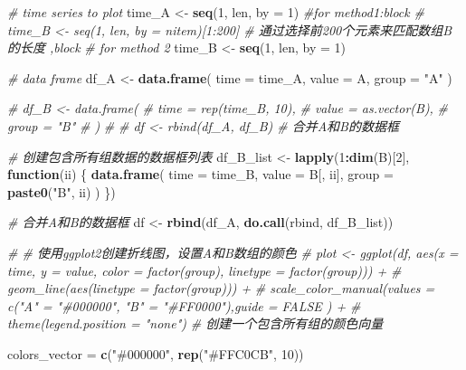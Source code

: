 \documentclass[
]{article}
\newenvironment{Shaded}{\begin{snugshade}}{\end{snugshade}}
\newcommand{\AttributeTok}[1]{\textcolor[rgb]{0.13,0.29,0.53}{#1}}
\newcommand{\CommentTok}[1]{\textcolor[rgb]{0.56,0.35,0.01}{\textit{#1}}}
\newcommand{\ControlFlowTok}[1]{\textcolor[rgb]{0.13,0.29,0.53}{\textbf{#1}}}
\newcommand{\DecValTok}[1]{\textcolor[rgb]{0.00,0.00,0.81}{#1}}
\newcommand{\FunctionTok}[1]{\textcolor[rgb]{0.13,0.29,0.53}{\textbf{#1}}}
\newcommand{\NormalTok}[1]{#1}
\newcommand{\OtherTok}[1]{\textcolor[rgb]{0.56,0.35,0.01}{#1}}
\newcommand{\SpecialCharTok}[1]{\textcolor[rgb]{0.81,0.36,0.00}{\textbf{#1}}}
\newcommand{\StringTok}[1]{\textcolor[rgb]{0.31,0.60,0.02}{#1}}
\begin{document}
\begin{Shaded}
\begin{Highlighting}[]
\CommentTok{\# time series to plot}
\NormalTok{time\_A }\OtherTok{\textless{}{-}} \FunctionTok{seq}\NormalTok{(}\DecValTok{1}\NormalTok{, len, }\AttributeTok{by =} \DecValTok{1}\NormalTok{)  }
\CommentTok{\#for method1:block}
\CommentTok{\# time\_B \textless{}{-} seq(1, len, by = nitem)[1:200]  \# 通过选择前200个元素来匹配数组B的长度 ,block}
\CommentTok{\# for method 2}
\NormalTok{time\_B }\OtherTok{\textless{}{-}} \FunctionTok{seq}\NormalTok{(}\DecValTok{1}\NormalTok{, len, }\AttributeTok{by =} \DecValTok{1}\NormalTok{)}

\CommentTok{\# data frame}
\NormalTok{df\_A }\OtherTok{\textless{}{-}} \FunctionTok{data.frame}\NormalTok{(  }
  \AttributeTok{time =}\NormalTok{ time\_A,  }
  \AttributeTok{value =}\NormalTok{ A,  }
  \AttributeTok{group =} \StringTok{"A"}  
\NormalTok{)  }
  
\CommentTok{\# df\_B \textless{}{-} data.frame(  }
\CommentTok{\#   time = rep(time\_B, 10),  }
\CommentTok{\#   value = as.vector(B),  }
\CommentTok{\#   group = "B"  }
\CommentTok{\# )  }
\CommentTok{\#   }
\CommentTok{\# df \textless{}{-} rbind(df\_A, df\_B)  \# 合并A和B的数据框  }

  \CommentTok{\# 创建包含所有组数据的数据框列表  }
\NormalTok{df\_B\_list }\OtherTok{\textless{}{-}} \FunctionTok{lapply}\NormalTok{(}\DecValTok{1}\SpecialCharTok{:}\FunctionTok{dim}\NormalTok{(B)[}\DecValTok{2}\NormalTok{], }\ControlFlowTok{function}\NormalTok{(ii) \{  }
  \FunctionTok{data.frame}\NormalTok{(  }
    \AttributeTok{time =}\NormalTok{ time\_B,  }
    \AttributeTok{value =}\NormalTok{ B[, ii],  }
    \AttributeTok{group =} \FunctionTok{paste0}\NormalTok{(}\StringTok{"B"}\NormalTok{, ii)  }
\NormalTok{  )  }
\NormalTok{\})  }
  
\CommentTok{\# 合并A和B的数据框  }
\NormalTok{df }\OtherTok{\textless{}{-}} \FunctionTok{rbind}\NormalTok{(df\_A, }\FunctionTok{do.call}\NormalTok{(rbind, df\_B\_list)) }

\CommentTok{\# \# 使用ggplot2创建折线图，设置A和B数组的颜色  }
\CommentTok{\# plot \textless{}{-} ggplot(df, aes(x = time, y = value, color = factor(group), linetype = factor(group))) +    }
\CommentTok{\#   geom\_line(aes(linetype = factor(group))) +  }
\CommentTok{\#   scale\_color\_manual(values = c("A" = "\#000000", "B" = "\#FF0000"),guide = FALSE ) +  }
\CommentTok{\#   theme(legend.position = "none")  }
\CommentTok{\# 创建一个包含所有组的颜色向量  }
  
\NormalTok{colors\_vector }\OtherTok{=} \FunctionTok{c}\NormalTok{(}\StringTok{"\#000000"}\NormalTok{, }\FunctionTok{rep}\NormalTok{(}\StringTok{"\#FFC0CB"}\NormalTok{, }\DecValTok{10}\NormalTok{))  }
 

\end{Highlighting}
\end{Shaded}
\end{document}
